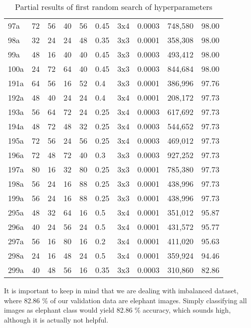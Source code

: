\begin{table}
\begin{tabular}{llllllllrl}
       97a & 72 & 56 & 40 & 56 & 0.45 & 3x4 & 0.0003 &   748,580 & 98.00\\
       98a & 32 & 24 & 24 & 48 & 0.35 & 3x3 & 0.0001 &   358,308 & 98.00\\
       99a & 48 & 16 & 40 & 40 & 0.45 & 3x3 & 0.0003 &   493,412 & 98.00\\
      100a & 24 & 72 & 64 & 40 & 0.45 & 3x3 & 0.0003 &   844,684 & 98.00\\\midrule
      191a & 64 & 56 & 16 & 52 & 0.4  & 3x3 & 0.0001 &   386,996 & 97.76\\
      192a & 48 & 40 & 24 & 24 & 0.4  & 3x4 & 0.0001 &   208,172 & 97.73\\
      193a & 56 & 64 & 72 & 24 & 0.25 & 3x4 & 0.0003 &   617,692 & 97.73\\
      194a & 48 & 72 & 48 & 32 & 0.25 & 3x4 & 0.0003 &   544,652 & 97.73\\
      195a & 72 & 56 & 24 & 56 & 0.25 & 3x4 & 0.0003 &   469,012 & 97.73\\
      196a & 72 & 48 & 72 & 40 & 0.3  & 3x3 & 0.0003 &   927,252 & 97.73\\
      197a & 80 & 16 & 32 & 80 & 0.25 & 3x3 & 0.0001 &   785,380 & 97.73\\
      198a & 56 & 24 & 16 & 88 & 0.25 & 3x3 & 0.0001 &   438,996 & 97.73\\
      199a & 56 & 24 & 16 & 88 & 0.25 & 3x3 & 0.0001 &   438,996 & 97.73\\\midrule
      295a & 48 & 32 & 64 & 16 & 0.5  & 3x4 & 0.0001 &   351,012 & 95.87\\
      296a & 40 & 24 & 56 & 24 & 0.5  & 3x4 & 0.0001 &   431,572 & 95.77\\
      297a & 56 & 16 & 80 & 16 & 0.2  & 3x4 & 0.0001 &   411,020 & 95.63\\
      298a & 24 & 16 & 48 & 24 & 0.5  & 3x4 & 0.0001 &   359,924 & 94.46\\
      299a & 40 & 48 & 56 & 16 & 0.35 & 3x3 & 0.0003 &   310,860 & 82.86\\\bottomrule
    \end{tabular}
    \caption{ Partial results of first random search of hyperparameters}
    \label{hyper_results1}
\end{table}

It is important to keep in mind that we are dealing with imbalanced dataset, where 82.86 \% of our validation data are elephant images.
Simply classifying all images as elephant class would yield 82.86 \% accuracy, which sounds high, although it is actually not helpful.

